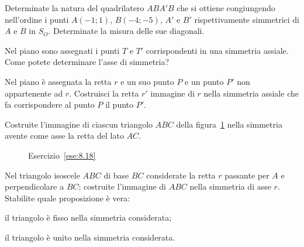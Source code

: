 \begin{esercizio}
\label{ese:8.15}
Determinate la natura del quadrilatero $ABA'B$ che si ottiene congiungendo nell'ordine i punti $A(-1;1)$, $B(-4;-5)$, $A'$ e $B'$ rispettivamente simmetrici di $A$ e $B$ in $S_O$. Determinate la misura delle sue diagonali.
\end{esercizio}

\begin{esercizio}
\label{ese:8.16}
Nel piano sono assegnati i punti $T$ e $T'$ corrispondenti in una simmetria assiale. Come potete determinare l'asse di simmetria?
\end{esercizio}

\noindent\begin{minipage}{0.6\textwidth}\parindent15pt
\begin{esercizio}
\label{ese:8.17}
Nel piano è assegnata la retta $r$ e un suo punto $P$ e un punto $P'$ non appartenente ad $r$. Costruisci la retta $r'$ immagine di $r$ nella simmetria assiale che fa corrispondere al punto $P$ il punto $P'$.
\end{esercizio}
\end{minipage}\hfil
\begin{minipage}{0.4\textwidth}
	\centering
\end{minipage}\vspace{5pt}

\begin{esercizio}
\label{ese:8.18}
Costruite l'immagine di ciascun triangolo $ABC$ della figura~\ref{fig:ese8.18} nella simmetria avente come asse la retta del lato $AC$.
\end{esercizio}

\begin{figure}[!htb]
	\centering
	\caption{Esercizio~\ref{ese:8.18}}\label{fig:ese8.18}
\end{figure}

\begin{esercizio}
\label{ese:8.19}
Nel triangolo isoscele $ABC$ di base $BC$ considerate la retta $r$ passante per $A$ e perpendicolare a $BC$; costruite l'immagine di $ABC$ nella simmetria di asse $r$. Stabilite quale proposizione è vera:
\begin{enumeratea}
\item il triangolo è fisso nella simmetria considerata;
\item il triangolo è unito nella simmetria considerata.
\end{enumeratea}
\end{esercizio}

